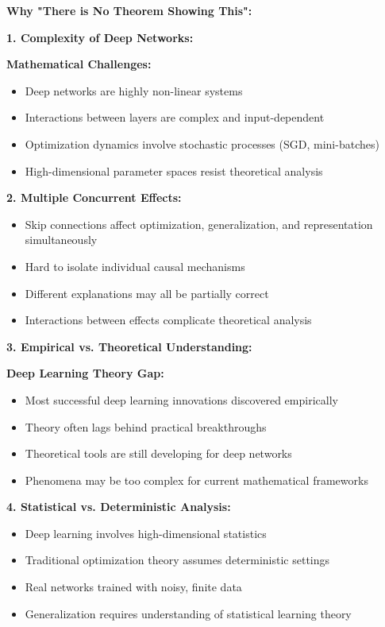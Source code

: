 \documentclass[12pt]{article}
\begin{document}
\begin{enumerate}[(a)]
{    \textbf{Why "There is No Theorem Showing This":}
    
    \textbf{1. Complexity of Deep Networks:}
    
    \textbf{Mathematical Challenges:}
    \begin{itemize}
        \item Deep networks are highly non-linear systems
        \item Interactions between layers are complex and input-dependent
        \item Optimization dynamics involve stochastic processes (SGD, mini-batches)
        \item High-dimensional parameter spaces resist theoretical analysis
    \end{itemize}
    
    \textbf{2. Multiple Concurrent Effects:}
    \begin{itemize}
        \item Skip connections affect optimization, generalization, and representation simultaneously
        \item Hard to isolate individual causal mechanisms
        \item Different explanations may all be partially correct
        \item Interactions between effects complicate theoretical analysis
    \end{itemize}
    
    \textbf{3. Empirical vs. Theoretical Understanding:}
    
    \textbf{Deep Learning Theory Gap:}
    \begin{itemize}
        \item Most successful deep learning innovations discovered empirically
        \item Theory often lags behind practical breakthroughs
        \item Theoretical tools are still developing for deep networks
        \item Phenomena may be too complex for current mathematical frameworks
    \end{itemize}
    
    \textbf{4. Statistical vs. Deterministic Analysis:}
    \begin{itemize}
        \item Deep learning involves high-dimensional statistics
        \item Traditional optimization theory assumes deterministic settings
        \item Real networks trained with noisy, finite data
        \item Generalization requires understanding of statistical learning theory
    \end{itemize}
    
}
\end{enumerate}
\end{document}

